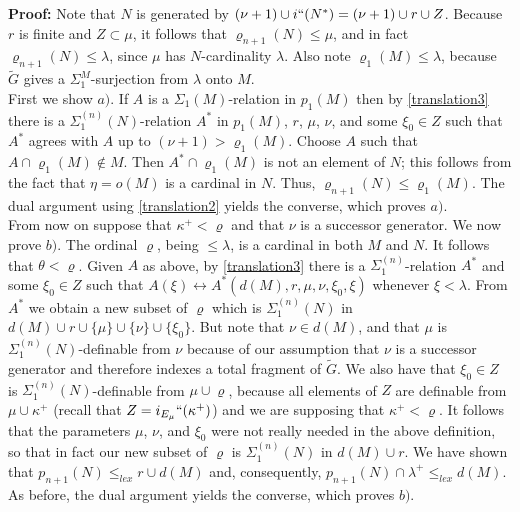 \documentclass[12pt]{article}
\begin{document}
\textbf{Proof:}  Note that $N$ is generated by $(\nu + 1) \cup i`` (N^*) = (\nu + 1) \cup r \cup Z$.  Because $r$ is finite and $Z \subset \mu$, it follows that $\varrho_{n+1} (N) \leq \mu$, and in fact $\varrho_{n+1} (N) \leq \lambda$, since $\mu$ has $N$-cardinality $\lambda$.  Also note $\varrho_1 (M) \leq \lambda$, because $\tilde{G}$ gives a $\Sigma_1^M$-surjection from $\lambda$ onto $M$.\\

First we show $a)$.  If $A$ is a $\Sigma_1 (M)$-relation in $p_1 (M)$ then by \ref{translation3} there is a $\Sigma_1^{(n)} (N)$-relation $A^*$ in $p_1 (M)$, $r$, $\mu$, $\nu$, and some $\xi_0 \in Z$ such that $A^*$ agrees with $A$ up to $(\nu + 1 ) > \varrho_1 (M)$.  Choose $A$ such that $A \cap \varrho_1 (M) \notin M$.  Then $A^* \cap \varrho_1 (M)$ is not an element of $N$; this follows from the fact that $\eta = o(M)$ is a cardinal in $N$.  Thus, $\varrho_{n+1}(N) \leq \varrho_1 (M)$.  The dual argument using \ref{translation2} yields the converse, which proves $a)$.\\



From now on suppose that $\kappa^+ < \varrho$ and that $\nu$ is a successor generator.  We now prove $b)$.  The ordinal $\varrho$, being $\leq \lambda$, is a cardinal in both $M$ and $N$.  It follows that $\theta < \varrho$.  Given $A$ as above, by \ref{translation3} there is a $\Sigma_1^{(n)}$-relation $A^*$ and some $\xi_0 \in Z$ such that $A(\xi) \leftrightarrow A^* ( d (M) , r , \mu, \nu, \xi_0 , \xi )$ whenever $\xi < \lambda$.  From $A^*$ we obtain a new subset of $\varrho$ which is $\Sigma_1^{(n)}(N)$ in $d (M) \cup  r \cup \{ \mu \} \cup \{ \nu \} \cup \{ \xi_0 \}$.  But note that $\nu \in d(M)$, and that $\mu$ is $\Sigma_1^{(n)}(N)$-definable from $\nu$ because of our assumption that $\nu$ is a successor generator and therefore indexes a total fragment of $\tilde{G}$.  We also have that $\xi_0 \in Z$ is $\Sigma_1^{(n)}(N)$-definable from $\mu \cup \varrho$, because all elements of $Z$ are definable from $\mu \cup \kappa^+$ (recall that $Z = i_{E_\mu}`` (\kappa^+)$) and we are supposing that $\kappa^+ < \varrho$.  It follows that the parameters $\mu$, $\nu$, and $\xi_0$ were not really needed in the above definition, so that in fact our new subset of $\varrho$ is $\Sigma_1^{(n)}(N)$ in $d (M) \cup  r $.  We have shown that $p_{n+1} (N) \leq_{lex} r \cup d (M)$ and, consequently, $p_{n+1} (N) \cap \lambda^+ \leq_{lex} d (M)$.  As before, the dual argument yields the converse, which proves $b)$.\\
\end{document}
